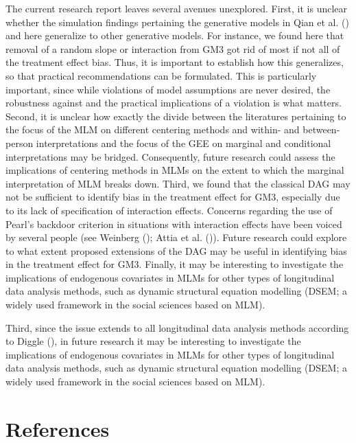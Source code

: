 \documentclass[
  12pt,
  a4paper,
]{article}
\begin{document}
The current research report leaves several avenues unexplored. First, it
is unclear whether the simulation findings pertaining the generative
models in Qian et al. () and here
generalize to other generative models. For instance, we found here that
removal of a random slope or interaction from GM3 got rid of most if not
all of the treatment effect bias. Thus, it is important to establish how
this generalizes, so that practical recommendations can be formulated.
This is particularly important, since while violations of model
assumptions are never desired, the robustness against and the practical
implications of a violation is what matters. Second, it is unclear how
exactly the divide between the literatures pertaining to the focus of
the MLM on different centering methods and within- and between-person
interpretations and the focus of the GEE on marginal and conditional
interpretations may be bridged. Consequently, future research could
assess the implications of centering methods in MLMs on the extent to
which the marginal interpretation of MLM breaks down. Third, we found
that the classical DAG may not be sufficient to identify bias in the
treatment effect for GM3, especially due to its lack of specification of
interaction effects. Concerns regarding the use of Pearl's backdoor
criterion in situations with interaction effects have been voiced by
several people (see Weinberg (); Attia
et al. ()). Future research could explore
to what extent proposed extensions of the DAG may be useful in
identifying bias in the treatment effect for GM3. Finally, it may be
interesting to investigate the implications of endogenous covariates in
MLMs for other types of longitudinal data analysis methods, such as
dynamic structural equation modelling (DSEM; a widely used framework in
the social sciences based on MLM).

Third, since the issue extends to all longitudinal data analysis methods
according to Diggle (), in future
research it may be interesting to investigate the implications of
endogenous covariates in MLMs for other types of longitudinal data
analysis methods, such as dynamic structural equation modelling (DSEM; a
widely used framework in the social sciences based on MLM).

\newpage

\section{References}\label{references}
\end{document}
